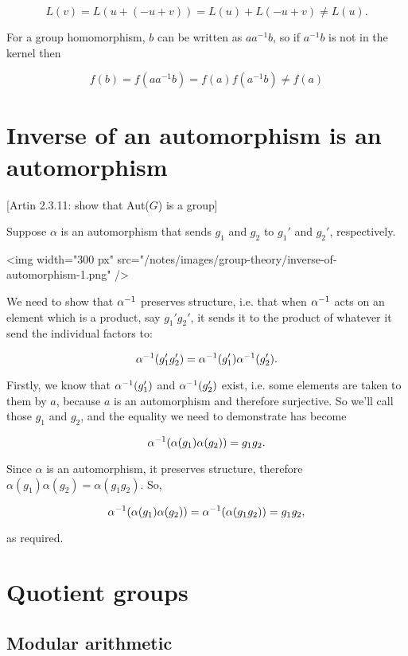 $$
L(v) = L(u + (-u + v)) = L(u) + L(-u + v) \neq L(u).
$$

For a group homomorphism, $b$ can be written as $aa^{-1}b$, so if $a^{-1}b$ is
not in the kernel then

$$
f(b) = f(aa^{-1}b) = f(a)f(a^{-1}b) \neq f(a)
$$


\section{Inverse of an automorphism is an automorphism}

[Artin 2.3.11: show that Aut($G$) is a group]

Suppose $\alpha$ is an automorphism that sends $g_1$ and $g_2$ to $g_1'$ and
$g_2'$, respectively.

<img width="300 px" src="/notes/images/group-theory/inverse-of-automorphism-1.png" />

We need to show that $\alpha^{-1}$ preserves structure, i.e. that when $\alpha^{-1}$ acts
on an element which is a product, say $g_1'g_2'$, it sends it to the product of
whatever it send the individual factors to:

$$
\alpha^{-1}(g_1'g_2') = \alpha^{-1}(g_1')\alpha^{-1}(g_2').
$$


Firstly, we know that $\alpha^{-1}(g_1')$ and $\alpha^{-1}(g_2')$ exist, i.e. some elements
are taken to them by $a$, because $a$ is an automorphism and therefore
surjective. So we'll call those $g_1$ and $g_2$, and the equality we need to
demonstrate has become

$$
\alpha^{-1}(\alpha(g_1)\alpha(g_2)) = g_1g_2.
$$

Since $\alpha$ is an automorphism, it preserves structure, therefore
$\alpha(g_1)\alpha(g_2) = \alpha(g_1g_2)$. So,

$$
\alpha^{-1}(\alpha(g_1)\alpha(g_2)) = \alpha^{-1}(\alpha(g_1g_2)) = g_1g_2,
$$

as required.
\newcommand{\textstack}[2]{
  \left(\begin{array}{c}
    \text{#1}  \\
    \text{#2}
  \end{array}\right)
}

\section{Quotient groups}
\subsection{Modular arithmetic}


